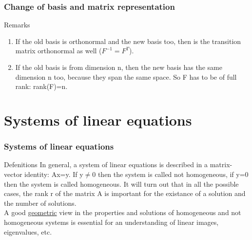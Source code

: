 \begin{frame}
	\frametitle{Change of basis and matrix representation}
	\begin{block}{Remarks}
		\begin{enumerate}
			\item If the old basis is orthonormal and the new basis too, then is the transition matrix orthonormal as well ($F^{-1}=F^T$).
			\item If the old basis is from dimension n, then the new basis has the same dimension n too, because they span the same space. So F has to be of full rank: rank(F)=n.
		\end{enumerate}
	\end{block}
\end{frame}

\section{Systems of linear equations}

\begin{frame}
	\frametitle{Systems of linear equations}
	\begin{block}{Defenitions}
		In general, a system of linear equations is described in a matrix-vector identity: Ax=y. If y$\neq$0 then the system is called not homogeneous, if y=0 then the system is called homogeneous. It will turn out that in all the possible cases, the rank r of the matrix A is important for the existance of a solution and the number of solutions.\\
		A good \underline{geometric} view in the properties and solutions of homogeneous and not homogeneous systems is essential for an understanding of linear images, eigenvalues, etc.
	\end{block}
\end{frame}

